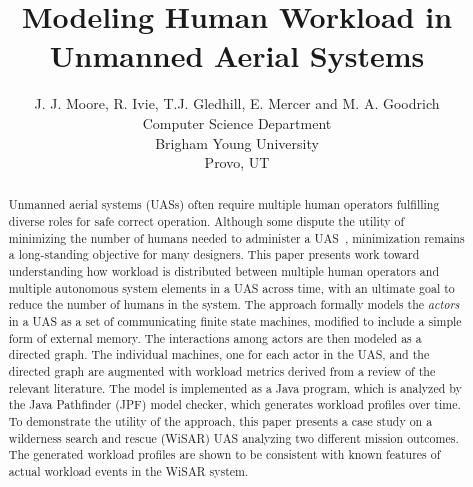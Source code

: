 \documentclass[letterpaper]{article}
\begin{document}
%
\title{Modeling Human Workload in Unmanned Aerial Systems}
\author{J. J. Moore, R. Ivie, T.J. Gledhill, E. Mercer and M. A. Goodrich\\
Computer Science Department \\ Brigham Young University \\ Provo, UT\\
}
\maketitle
\begin{abstract}
Unmanned aerial systems (UASs) often require multiple human operators fulfilling diverse roles for safe correct operation.  Although some dispute the utility of minimizing the number of humans needed to administer a UAS~\cite{MurphyBurke2010}, minimization remains a long-standing objective for many designers.  This paper presents work toward understanding how workload is distributed between multiple human operators and multiple autonomous system elements in a UAS across time, with an ultimate goal to reduce the number of humans in the system. The approach formally models the {\em actors} in a UAS as a set of communicating finite state machines, modified to include a simple form of external memory. The interactions among actors are then modeled as a directed graph.  The individual machines, one for each actor in the UAS, and the directed graph are augmented with workload metrics derived from a review of the relevant literature. The model is implemented as a Java program, which is analyzed by the Java Pathfinder (JPF) model checker, which generates workload profiles over time.  To demonstrate the utility of the approach, this paper presents a case study on a wilderness search and rescue (WiSAR) UAS analyzing two different mission outcomes. The generated workload profiles are shown to be consistent with known features of actual workload events in the WiSAR system. 
\end{abstract}

\noindent 









\end{document}
